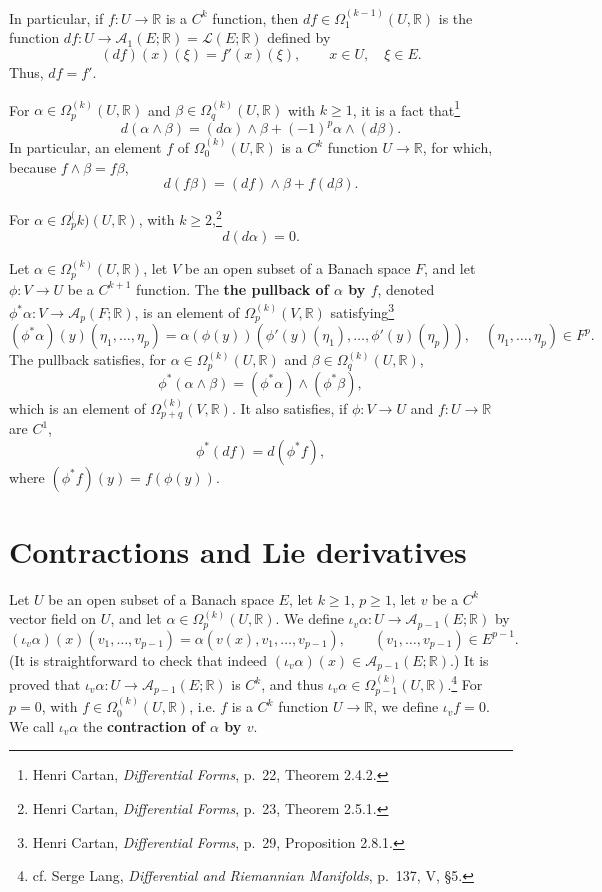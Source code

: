 \documentclass{article}
\theoremstyle{definition}
\begin{document}
In particular, if $f:U \to \mathbb{R}$ is a $C^k$ function, then
$df \in \Omega_1^{(k-1)}(U,\mathbb{R})$ is the function
$df:U \to \mathscr{A}_1(E;\mathbb{R})=\mathscr{L}(E;\mathbb{R})$ defined by
\[
(df)(x)(\xi) = f'(x)(\xi), \qquad x \in U, \quad \xi \in E.
\]
Thus, $df=f'$. 

For $\alpha \in \Omega_p^{(k)}(U,\mathbb{R})$ and $\beta \in \Omega_q^{(k)}(U,\mathbb{R})$
with $k \geq 1$, it is a fact that\footnote{Henri Cartan,
{\em Differential Forms}, p.~22, Theorem 2.4.2.}
\[
d(\alpha \wedge \beta) = (d\alpha) \wedge \beta + (-1)^p \alpha \wedge(d\beta).
\]
In particular, an element $f$ of $\Omega_0^{(k)}(U,\mathbb{R})$ is a $C^k$ function
$U \to \mathbb{R}$, for which, because $f \wedge \beta = f \beta$,  
\[
d(f \beta) = (df) \wedge \beta + f (d\beta).
\]

For $\alpha \in \Omega_p^({k)}(U,\mathbb{R})$, with $k \geq 2$,\footnote{Henri Cartan,
{\em Differential Forms}, p.~23, Theorem 2.5.1.}
\[
d(d\alpha)=0.
\]

Let $\alpha \in \Omega_p^{(k)}(U,\mathbb{R})$, let
$V$ be an open subset of a Banach space $F$, and let 
$\phi:V \to U$ be a $C^{k+1}$ function. 
The \textbf{the pullback of $\alpha$ by $f$}, denoted
$\phi^* \alpha:V \to \mathscr{A}_p(F;\mathbb{R})$, is an element of
$\Omega_p^{(k)}(V,\mathbb{R})$ 
satisfying\footnote{Henri Cartan,
{\em Differential Forms}, p.~29, Proposition 2.8.1.}
\[
(\phi^* \alpha)(y)(\eta_1,\ldots,\eta_p) = \alpha(\phi(y))(\phi'(y)(\eta_1),\ldots,
\phi'(y)(\eta_p)),
\quad (\eta_1,\ldots,\eta_p) \in F^p.
\]
The pullback satisfies, for $\alpha \in \Omega_p^{(k)}(U,\mathbb{R})$
and $\beta \in \Omega_q^{(k)}(U,\mathbb{R})$,
\[
\phi^*(\alpha \wedge \beta)  = (\phi^* \alpha) \wedge (\phi^* \beta),
\]
which is an element of $\Omega_{p+q}^{(k)}(V,\mathbb{R})$. It also satisfies,
if $\phi:V \to U$ and $f:U \to \mathbb{R}$ are $C^1$, 
\[
\phi^*(df) = d(\phi^*f),
\]
where $(\phi^*f)(y) = f(\phi(y))$. 



\section{Contractions and Lie derivatives}
Let $U$ be an open subset of a Banach space $E$, let $k \geq 1$, $p \geq 1$, let
$v$ be a $C^k$ vector field on $U$, and let $\alpha \in \Omega_p^{(k)}(U,\mathbb{R})$. 
We define $\iota_v \alpha:U \to \mathscr{A}_{p-1}(E;\mathbb{R})$ by
\[
(\iota_v \alpha)(x)(v_1,\ldots,v_{p-1}) = \alpha(v(x),v_1,\ldots,v_{p-1}), \qquad (v_1,\ldots,v_{p-1}) \in E^{p-1}.
\]
(It is straightforward to check that indeed $(\iota_v \alpha)(x) \in \mathscr{A}_{p-1}(E;\mathbb{R})$.)
It is proved that $\iota_v \alpha:U \to \mathscr{A}_{p-1}(E;\mathbb{R})$ is $C^k$, and thus
$\iota_v \alpha \in \Omega_{p-1}^{(k)}(U,\mathbb{R})$.\footnote{cf. Serge Lang,
{\em Differential and Riemannian Manifolds}, p.~137, V, \S 5.}
For $p=0$, with $f \in \Omega_0^{(k)}(U,\mathbb{R})$, i.e. $f$ is a $C^k$ function
$U \to \mathbb{R}$,
we define $\iota_v f = 0$.
We call $\iota_v \alpha$ the \textbf{contraction of $\alpha$ by $v$}.
\end{document}
